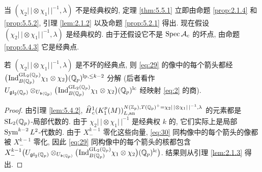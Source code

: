 当 $(\chi_2|\,| \otimes \chi_1|\,|^{-1},\lambda)$ 不是经典权的, 定理 \ref{thm:5.5.1} 立即由命题 \ref{prop:2.1.4} 和 \ref{prop:5.5.2}, 引理 \ref{lem:2.1.2} 以及命题 \ref{prop:5.2.1} 得出.
现在假设 $(\chi_2|\,| \otimes \chi_1|\,|^{-1},\lambda)$ 是经典权的.
由于还假设它不是 $\operatorname{Spec} \mathcal{A}_c$ 的坏点, 由命题 \ref{prop:5.4.3} 它是经典点.

\setcounter{theorem}{4}
\begin{lemma}\label{lem:5.5.5}
若 $(\chi_2|\,| \otimes \chi_1|\,|^{-1},\lambda)$ 是不坏的经典点, 则 \eqref{eq:29} 的像中的每个箭头都经 $\bigl(\prescript{}{}{\mathrm{Ind}}_{B(\mathbb{Q}_p)}^{\mathrm{GL}_2(\mathbb{Q}_p)} \chi_1 \otimes \chi_2\bigr)(\mathbb{Q}_p)^{\mathrm{lp},\le k-2}$ 分解 (后者看作 $U_{\mathfrak{gl}_2(\mathbb{Q}_p)} \otimes_{U_{\mathfrak{b}(\mathbb{Q}_p)}} \bigl(\prescript{}{}{\mathrm{Ind}}_{B(\mathbb{Q}_p)}^{\mathrm{GL}_2(\mathbb{Q}_p)} \chi_1 \otimes \chi_2\bigr)(\mathbb{Q}_p)^{\mathrm{lc}}$ 经映射 \eqref{eq:2} 的商).
\end{lemma}

\begin{proof}
由引理 \ref{lem:5.4.2}, $\widehat{H}{}_{c}^{1}(K_1^{p}(M))_{L,\mathrm{an}}^{N(\mathbb{Z}_p),T(\mathbb{Q}_p)^{+} = \chi_2|\,| \otimes \chi_1|\,|^{-1},\lambda}$ 的元素都是 $\mathrm{SL}_2(\mathbb{Q}_p)$-局部代数的.
由于 $\chi_2|\,| \otimes \chi_1|\,|^{-1}$ 是经典权 $k$ 的, 它们实际上是局部 $\operatorname{Sym}^{k-2}L^{2}$-代数的.
由于 $X_{-}^{k-1}$ 零化这些向量, \eqref{eq:30} 同构像中的每个箭头的像都被 $X_{-}^{k-1}$ 零化, 因此 \eqref{eq:29} 同构像中的每个箭头的核都包含 $X_{-}^{k-1}\bigl(U_{\mathfrak{gl}_2(\mathbb{Q}_p)} \otimes_{U_{\mathfrak{b}(\mathbb{Q}_p)}} \bigl(\prescript{}{}{\mathrm{Ind}}_{B(\mathbb{Q}_p)}^{\mathrm{GL}_2(\mathbb{Q}_p)} \chi_1 \otimes \chi_2\bigr)(\mathbb{Q}_p)^{\mathrm{lc}}\bigr)$.
结果则从引理 \ref{lem:2.1.3} 得出.
\end{proof}

